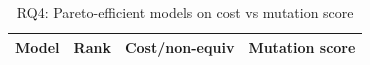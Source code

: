 \begin{table}[htbp]
\centering
{\small
\begin{tabular}{l|rrr}
\toprule
\textbf{Model} & \textbf{Rank} & \textbf{Cost/non-equiv} & \textbf{Mutation score} \\
\midrule
\bottomrule
\end{tabular}
}
\caption{RQ4: Pareto-efficient models on cost vs mutation score}
\label{tab:rq4-pareto}
\end{table}